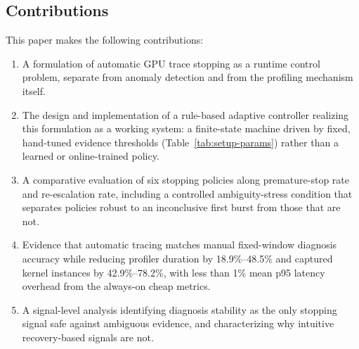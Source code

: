 \subsection{Contributions}

This paper makes the following contributions:

\begin{enumerate}
  \item A formulation of automatic GPU trace stopping as a runtime control problem, separate from anomaly detection and from the profiling mechanism itself.
  \item The design and implementation of a rule-based adaptive controller realizing this formulation as a working system: a finite-state machine driven by fixed, hand-tuned evidence thresholds (Table~\ref{tab:setup-params}) rather than a learned or online-trained policy.
  \item A comparative evaluation of six stopping policies along premature-stop rate and re-escalation rate, including a controlled ambiguity-stress condition that separates policies robust to an inconclusive first burst from those that are not.
  \item Evidence that automatic tracing matches manual fixed-window diagnosis accuracy while reducing profiler duration by 18.9\%--48.5\% and captured kernel instances by 42.9\%--78.2\%, with less than 1\% mean p95 latency overhead from the always-on cheap metrics.
  \item A signal-level analysis identifying diagnosis stability as the only stopping signal safe against ambiguous evidence, and characterizing why intuitive recovery-based signals are not.
\end{enumerate}